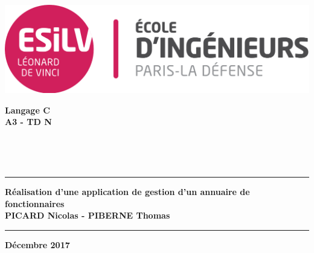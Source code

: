 \begin{titlepage}
	\begin{minipage}[c]{.46\linewidth}
		\begin{flushleft}
			\noindent
			\includegraphics[scale=0.13]{./img/Logo_ESILV.png}
		\end{flushleft}
	\end{minipage} \hfill
	\begin{minipage}[c]{.46\linewidth}
		\begin{flushright}
			\Large \textbf{Langage C\\A3 - TD N}
		\end{flushright}
	\end{minipage}
	\\
	\begin{center}
		\textsc{\large}\\[4.5cm]
		\rule{\linewidth}{.5pt}
		{\huge \bfseries Réalisation d'une application de gestion d'un annuaire de fonctionnaires\\[0.3cm]
		PICARD Nicolas - PIBERNE Thomas\\}
		\rule{\linewidth}{.5pt}
	\vfill
	{\large \textbf{Décembre 2017}}
	\end{center}
\end{titlepage}